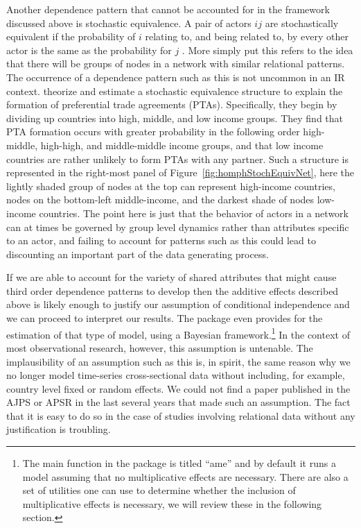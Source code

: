 Another dependence pattern that cannot be accounted for in the framework discussed above is stochastic equivalence. A pair of actors $ij$ are stochastically equivalent if the probability of $i$ relating to, and being related to, by every other actor is the same as the probability for $j$ \citep{anderson:etal:1992}. More simply put this refers to the idea that there will be groups of nodes in a network with similar relational patterns. The occurrence of a dependence pattern such as this is not uncommon in an IR context. \citet{manger:etal:2012} theorize and estimate a stochastic equivalence structure to explain the formation of preferential trade agreements (PTAs). Specifically, they begin by dividing up countries into high, middle, and low income groups. They find that PTA formation occurs with greater probability in the following order high-middle, high-high, and middle-middle income groups, and that low income countries are rather unlikely to form PTAs with any partner. Such a structure is represented in the right-most panel of Figure~\ref{fig:homphStochEquivNet}, here the lightly shaded group of nodes at the top can represent high-income countries, nodes on the bottom-left middle-income, and the darkest shade of nodes low-income countries. The point here is just that the behavior of actors in a network can at times be governed by group level dynamics rather than attributes specific to an actor, and failing to account for patterns such as this could lead to discounting an important part of the data generating process. 

If we are able to account for the variety of shared attributes that might cause third order dependence patterns to develop then the additive effects described above is likely enough to justify our assumption of conditional independence and we can proceed to interpret our results. The  package even provides for the estimation of that type of model, using a Bayesian framework.\footnote{The main function in the  package is titled ``ame'' and by default it runs a model assuming that no multiplicative effects are necessary. There are also a set of utilities one can use to determine whether the inclusion of multiplicative effects is necessary, we will review these in the following section.} In the context of most observational research, however, this assumption is untenable. The implausibility of an assumption such as this is, in spirit, the same reason why we no longer model time-series cross-sectional data without including, for example, country level fixed or random effects. We could not find a paper published in the AJPS or APSR in the last several years that made such an assumption. The fact that it is easy to do so in the case of studies involving relational data without any justification is troubling. 

